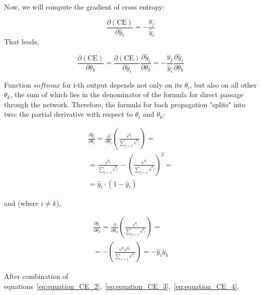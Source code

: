 Now, we will compute the gradient of cross entropy:

\begin{equation}
\label{eq:equation_CE_2}
\frac{\partial(\textrm{CE})}{\partial{\hat{y}_{i}}} = -\frac{y_{j}}{\hat{y}_{i}}
\end{equation}
That leads, 

\begin{equation}
\frac{\partial(\textrm{CE})}{\partial{\theta_{k}}} =  \frac{\partial(\textrm{CE})}{\partial{\hat{y}_{i}}}\frac{\partial{\hat{y}_{i}}}{\partial{\theta_{k}}} 
=-\frac{y_{j}}{\hat{y}_{i}}\frac{\partial{\hat{y}_{i}}}{\partial{\theta_{k}}}
\end{equation}

Function $softmax$ for i-th output depends not only on its $\theta_{i}$, but also on all other $\theta_{k}$, the sum of which lies in the denominator of the formula for direct passage through the network. Therefore, the formula for back propagation "splits" into two: the partial derivative with respect to $\theta_{i}$ and $\theta_{k}$:

\begin{equation}
\begin{multlined}
\label{eq:equation_CE_3}
\frac{\partial{\hat{y}_{i}}}{\partial{\theta_{i}}} =  \frac{\partial}{\partial{\theta_{i}}}\left( \frac{e^{\theta_{i}}}{\sum_{j=1}{e^{\theta_{j}}}}\right) =\\
= \frac{e^{\theta_{i}}}{\sum_{j=1}{e^{\theta_{j}}}} - \left(\frac{e^{\theta_{i}}}{\sum_{j=1}{e^{\theta_{j}}}}\right)^{2} = \\
= \hat{y}_{i}\cdot(1 - \hat{y}_{i})
\end{multlined}
\end{equation}

and (where $i\neq k$),

\begin{equation}
\label{eq:equation_CE_4}
\begin{multlined}
\frac{\partial{\hat{y}_{i}}}{\partial{\theta_{k}}} =  \frac{\partial}{\partial{\theta_{k}}}\left( \frac{e^{\theta_{i}}}{\sum_{j=1}{e^{\theta_{j}}}}\right) = \\
=-\left(\frac{e^{\theta_{i}}e^{\theta_{k}}}{\sum_{j=1}{e^{\theta_{j}}}}\right)
= - \hat{y}_{i}\hat{y}_{k}
\end{multlined}
\end{equation}

After combination of equations~\ref{eq:equation_CE_2},~\ref{eq:equation_CE_3},~\ref{eq:equation_CE_4}, 

